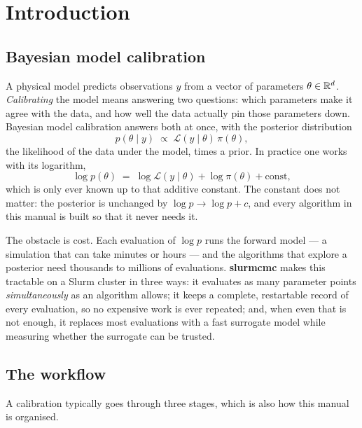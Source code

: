 \chapter{Introduction}
\label{ch:intro}

\section{Bayesian model calibration}

A physical model predicts observations $y$ from a vector of parameters $\theta \in \mathbb{R}^d$.
\emph{Calibrating} the model means answering two questions: which parameters make it agree with
the data, and how well the data actually pin those parameters down. Bayesian model calibration
answers both at once, with the posterior distribution
\begin{equation}
  p(\theta \mid y) \;\propto\; \mathcal{L}(y \mid \theta)\,\pi(\theta),
  \label{eq:bayes}
\end{equation}
the likelihood of the data under the model, times a prior. In practice one works with its
logarithm,
\begin{equation}
  \log p(\theta) \;=\; \log \mathcal{L}(y \mid \theta) + \log \pi(\theta) + \text{const},
  \label{eq:logpost}
\end{equation}
which is only ever known up to that additive constant. The constant does not matter: the
posterior is unchanged by $\log p \to \log p + c$, and every algorithm in this manual is built so
that it never needs it.

The obstacle is cost. Each evaluation of $\log p$ runs the forward model --- a simulation that can
take minutes or hours --- and the algorithms that explore a posterior need thousands to millions of
evaluations. \textbf{slurmcmc} makes this tractable on a Slurm cluster in three ways: it evaluates
as many parameter points \emph{simultaneously} as an algorithm allows; it keeps a complete,
restartable record of every evaluation, so no expensive work is ever repeated; and, when even that
is not enough, it replaces most evaluations with a fast surrogate model while measuring whether the
surrogate can be trusted.

\section{The workflow}

A calibration typically goes through three stages, which is also how this manual is organised.

